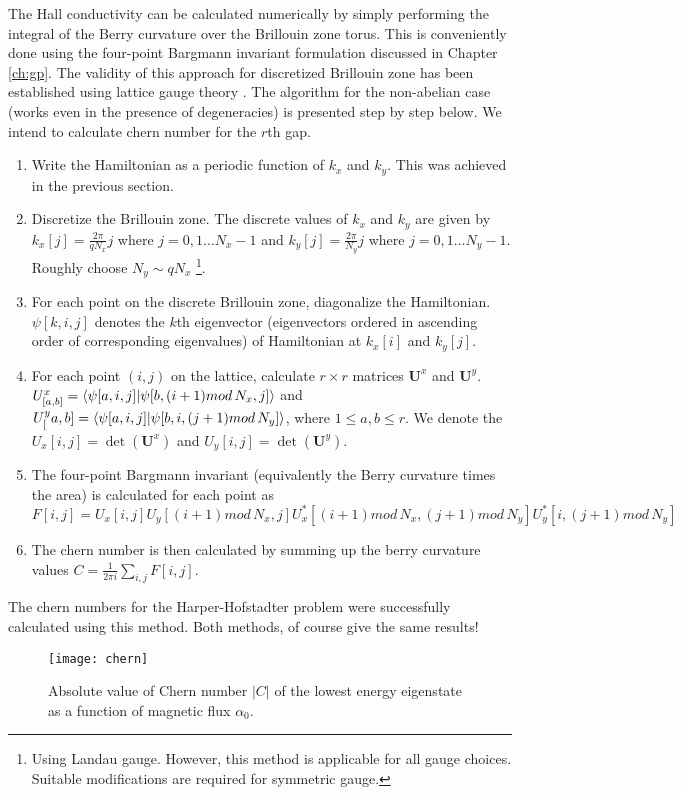 The Hall conductivity can be calculated numerically by simply performing the integral of the Berry curvature over the Brillouin zone torus. This is conveniently done using
the four-point Bargmann invariant formulation discussed in Chapter \ref{ch:gp}. The validity of this approach for discretized Brillouin zone has been established using 
lattice gauge theory \cite{fukui2005chern,hatsugai2006topological,aidelsburger2016artificial,rasta2016geometry}. The algorithm for the non-abelian case (works even in the presence of degeneracies) is presented step by step below. We intend to calculate chern number
for the $r$th gap.
\begin{enumerate}
 \item Write the Hamiltonian as a periodic function of $k_x$ and $k_y$. This was achieved in the previous section.
 \item Discretize the Brillouin zone. The discrete values of $k_x$ and $k_y$ are given by $k_x[j] = \frac{2\pi}{qN_{x}} j$ where $j=0,1\dots N_{x}-1$ and $k_y[j] = \frac{2\pi}{N_{y}} j$ where $j=0,1\dots N_{y}-1$. Roughly choose $N_{y} \sim qN_{x}$ \footnote{Using Landau gauge. However, this method is applicable for all gauge choices. Suitable modifications are required for symmetric gauge.}. 
 \item For each point on the discrete Brillouin zone, diagonalize the Hamiltonian. $\psi[k,i,j]$ denotes the $k$th eigenvector (eigenvectors ordered in ascending order of corresponding eigenvalues) of
 Hamiltonian at $k_x[i]$ and $k_y[j]$.
 \item For each point $(i,j)$ on the lattice, calculate $r \times r$ matrices $\mathbf{U}^{x}$ and $\mathbf{U}^{y}$. $U^{x}_{[a,b]} = \braket{\psi[a,i,j]|\psi[b,(i+1)mod\,N_{x},j]}$ and $U^{y}_[a,b] = \braket{\psi[a,i,j]|\psi[b,i,(j+1)mod\,N_{y}]}$, where $1\leq a,b \leq r$.
 We denote the $U_{x}[i,j] = \det(\mathbf{U}^{x})$ and $U_{y}[i,j] = \det(\mathbf{U}^{y})$.
 \item The four-point Bargmann invariant (equivalently the Berry curvature times the area) is calculated for each point as 
 \begin{equation*}
  F[i,j] = U_{x}[i,j]U_{y}[(i+1)mod\,N_{x},j]U_{x}^{*}[(i+1)mod\,N_{x},(j+1)mod\,N_{y}]U_{y}^{*}[i,(j+1)mod\,N_{y}]
 \end{equation*}
 \item The chern number is then calculated by summing up the berry curvature values $C = \frac{1}{2\pi i}\sum_{i,j}F[i,j]$. 
\end{enumerate}
The chern numbers for the Harper-Hofstadter problem were successfully calculated using this method. Both methods, of course give the same results!

\begin{figure}[h]
 \centering
 \texttt{[image: chern]}
 \caption{Absolute value of Chern number $|C|$ of the lowest energy eigenstate as a function of magnetic flux $\alpha_0$.}
\end{figure}
